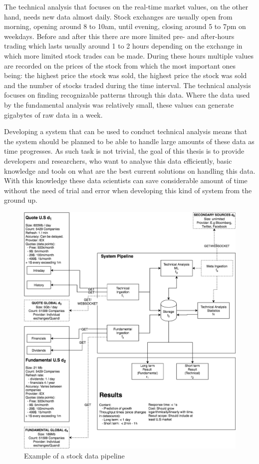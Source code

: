 The technical analysis that focuses on the real-time market values, on the other hand, needs new data almost daily.
Stock exchanges are usually open from morning, opening around 8 to 10am, until evening, closing around 5 to 7pm on weekdays.
Before and after this there are more limited pre- and after-hours trading which lasts usually around 1 to 2 hours depending on the exchange in which more limited stock trades can be made.
During these hours multiple values are recorded on the prices of the stock from which the most important ones being: the highest price the stock was sold, the highest price the stock was sold and the number of stocks traded during the time interval.
The technical analysis focuses on finding recognizable patterns through this data. \cite{murphy}
Where the data used by the fundamental analysis was relatively small, these values can generate gigabytes of raw data in a week.

Developing a system that can be used to conduct technical analysis means that the system should be planned to be able to handle large amounts of these data as time progresses.
As such task is not trivial, the goal of this thesis is to provide developers and researchers, who want to analyse this data efficiently, basic knowledge and tools on what are the best current solutions on handling this data.
With this knowledge these data scientists can save considerable amount of time without the need of trial and error when developing this kind of system from the ground up.

\begin{figure}[ht]
    \includegraphics[scale=0.36]{images/system2} 
    \centering
    \caption{Example of a stock data pipeline}
\end{figure}

